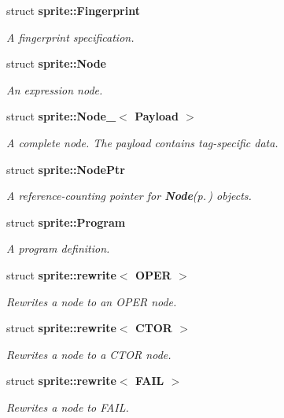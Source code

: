 \begin{CompactItemize}
struct {\bf sprite::Fingerprint}
\begin{CompactList}\small\item\em A fingerprint specification. \item\end{CompactList}\item 
struct {\bf sprite::Node}
\begin{CompactList}\small\item\em An expression node. \item\end{CompactList}\item 
struct {\bf sprite::Node\_\-$<$ Payload $>$}
\begin{CompactList}\small\item\em A complete node. The payload contains tag-specific data. \item\end{CompactList}\item 
struct {\bf sprite::Node\-Ptr}
\begin{CompactList}\small\item\em A reference-counting pointer for {\bf Node}{\rm (p.\,\pageref{structsprite_1_1Node})} objects. \item\end{CompactList}\item 
struct {\bf sprite::Program}
\begin{CompactList}\small\item\em A program definition. \item\end{CompactList}\item 
struct {\bf sprite::rewrite$<$ OPER $>$}
\begin{CompactList}\small\item\em Rewrites a node to an OPER node. \item\end{CompactList}\item 
struct {\bf sprite::rewrite$<$ CTOR $>$}
\begin{CompactList}\small\item\em Rewrites a node to a CTOR node. \item\end{CompactList}\item 
struct {\bf sprite::rewrite$<$ FAIL $>$}
\begin{CompactList}\small\item\em Rewrites a node to FAIL. \item\end{CompactList}\item 

\end{CompactItemize}
